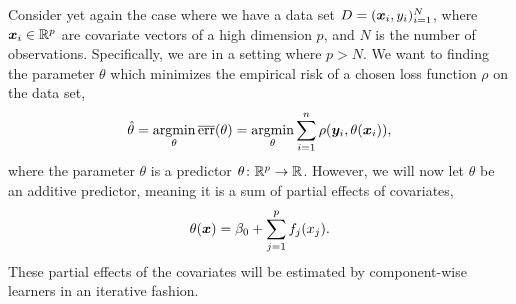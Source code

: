 Consider yet again the case where we have a data set $D=(\bm{x}_i,y_i)_{i=1}^N$, where $\bm{x}_i\in\mathbb{R}^p$ are covariate vectors of a high dimension $p$, and $N$ is the number of observations.
Specifically, we are in a setting where $p>N$.
We want to finding the parameter $\theta$ which minimizes the empirical risk of a chosen loss function $\rho$ on the data set,
\begin{equation*}
    \hat{\theta}=\operatorname*{argmin}_{\theta}\overline{\text{err}}(\theta)=\operatorname*{argmin}_{\theta}\sum_{i=1}^n\rho(\bm{y}_i,\theta(\bm{x}_i)),
\end{equation*}
where the parameter $\theta$ is a predictor $\theta\colon\mathbb{R}^p\to\mathbb{R}$.
However, we will now let $\theta$ be an additive predictor, meaning it is a sum of partial effects of covariates,
\begin{equation*}
    \theta(\bm{x})=\beta_0+\sum_{j=1}^p f_j(x_j).
\end{equation*}
These partial effects of the covariates will be estimated by component-wise learners in an iterative fashion.

